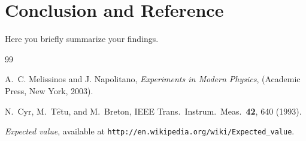 \documentclass[letterpaper,12pt]{article}
\begin{document}
\section{Conclusion and Reference}
Here you briefly summarize your findings.


\begin{thebibliography}{99}

A.~C. Melissinos and J. Napolitano, \textit{Experiments in Modern Physics},
(Academic Press, New York, 2003).

N.\ Cyr, M.\ T$\hat{e}$tu, and M.\ Breton,
IEEE Trans.\ Instrum.\ Meas.\ \textbf{42}, 640 (1993).

 \emph{Expected value},  available at
\texttt{http://en.wikipedia.org/wiki/Expected\_value}.

\end{thebibliography}
\end{document}
